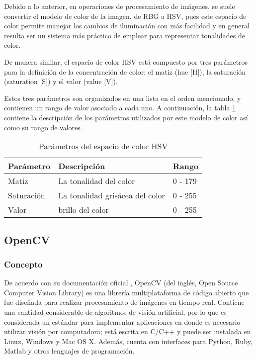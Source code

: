Debido a lo anterior, en operaciones de procesamiento de imágenes, se suele convertir el modelo de color de la imagen, de RBG a HSV, pues este espacio de color permite manejar los cambios de iluminación con más facilidad y en general resulta ser un sistema más práctico de emplear para representar tonalidades de color.

De manera similar, el espacio de color HSV está compuesto por tres parámetros para la definición de la concentración de color: el matiz (hue [H]), la saturación (saturation [S]) y el valor (value [V]). 

Estos tres parámetros son organizados en una lista en el orden mencionado, y contienen un rango de valor asociado a cada uno. A continuación, la tabla \ref{tab:hsv_param} contiene la descripción de los parámetros utilizados por este modelo de color así como su rango de valores.

\begin{table}[ht]
    \centering
    \begin{tabular}{lll}
        \hline
        Parámetro & Descripción & Rango\\
        \hline \hline
        Matiz & La tonalidad del color & 0 - 179\\
        Saturación & La tonalidad grisácea del color & 0 - 255\\
        Valor & brillo del color & 0 - 255\\
        \hline \hline
    \end{tabular}
    \caption{Parámetros del espacio de color HSV}
    \label{tab:hsv_param}
\end{table}

\subsection{OpenCV}

\subsubsection{Concepto}

De acuerdo con su documentación oficial \cite{OpenCV}, OpenCV (del inglés, Open Source Computer Vision Library) es una librería multiplataforma de código abierto que fue diseñada para realizar procesamiento de imágenes en tiempo real. Contiene una cantidad considerable de algoritmos de visión artificial, por lo que es considerada un estándar para implementar aplicaciones en donde es necesario utilizar visión por computadora; está escrita en C/C++ y puede ser instalada en Linux, Windows y Mac OS X. Además, cuenta con interfaces para Python, Ruby, Matlab y otros lenguajes de programación. 

